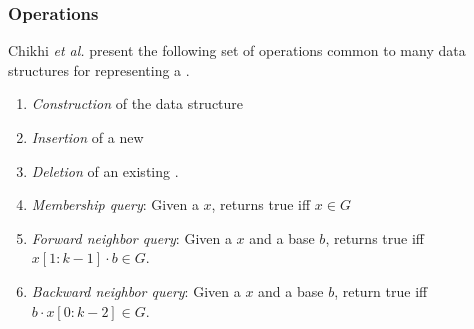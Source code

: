 

\subsubsection{Operations}

Chikhi \emph{et al.} \cite{Chikhi2019} present the following set of operations common to many data structures for representing a \dBG {}.

\begin{enumerate}
  \item \emph{Construction} of the data structure
  \item \emph{Insertion} of a new \kmer {}
  \item \emph{Deletion} of an existing \kmer.
  \item \emph{Membership query}: Given a \kmer $x$, returns true iff $x \in G$
  \item \emph{Forward neighbor query}: Given a \kmer $x$ and a base $b$, returns true iff $x[1:k-1] \cdot b \in G$.
  \item \emph{Backward neighbor query}: Given a \kmer $x$ and a base $b$, return true iff $b \cdot x[0:k-2] \in G$.
\end{enumerate}

